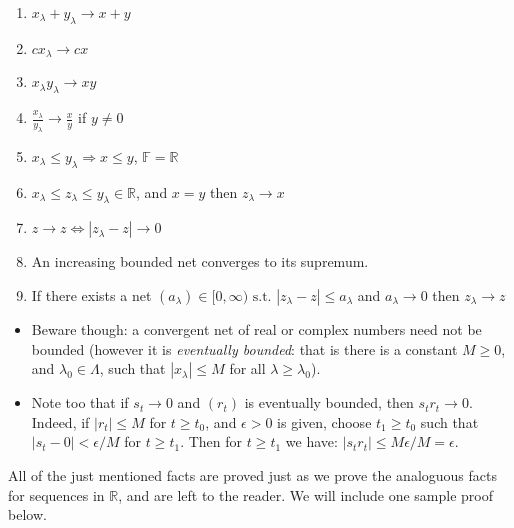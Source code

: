 \documentclass[12pt]{article}
\newcommand{\st}[0]{ \textrm{ s.t. } }
\newcommand{\rimply}[0] { \Rightarrow }
\newcommand{\lrimply}[0] { \Leftrightarrow }
\newcommand{\rarw}[0] { \rightarrow }
\newcommand{\reals}[0] { \mathbb{R}}
\newcommand{\scalars}[0] { \mathbb{F}}
\newcommand{\Cdb}[0] { \mathbb{C}}
\begin{document}
\begin{enumerate}[1)]
\item $x_\lambda + y_\lambda \rarw x + y$
\item $c x_\lambda \rarw c x$
\item $x_\lambda y_\lambda \rarw xy$
\item $\frac{x_\lambda}{y_\lambda} \rarw \frac{x}{y}$ if $y \not = 0$
\item $x_\lambda \le y_\lambda \rimply x\le y$, $\scalars = \reals$
\item $x_\lambda \le z_\lambda \le y_\lambda \in \reals$, and $x = y$ then $z_\lambda \rarw x$
\item $z \rarw z \lrimply |z_\lambda - z| \rarw 0$
\item An increasing bounded net converges to its supremum.
\item If there exists a net $(a_\lambda) \in [0,\infty) \st |z_\lambda - z| \le a_\lambda$ and $a_\lambda \rarw 0$ then $z_\lambda \rarw z$


\end{enumerate}


\begin{itemize}

\item Beware though: a convergent net of real or complex numbers need not
be bounded (however it is {\em eventually bounded}: that is there is
a constant $M \geq 0$, and $\lambda_0 \in \Lambda$, such that
$|x_\lambda| \leq M$ for all $\lambda \geq \lambda_0$).
\item Note too that if $s_t \to 0$ and $(r_t)$ is eventually bounded, then $s_t r_t
\to 0$. Indeed, if  $|r_t| \leq M$ for $t \geq t_0$, and $\epsilon >
0$ is given, choose $t_1 \geq t_0$ such that $|s_t - 0| <
\epsilon/M$ for $t \geq t_1$. Then for $t \geq t_1$ we have: $|s_t
r_t | \leq M \epsilon/M = \epsilon$.

\end{itemize}

All of the just mentioned facts are proved just as we prove the analoguous facts for sequences
in $\reals$, and are left to the reader.  We will include one sample
proof below.
\end{document}
